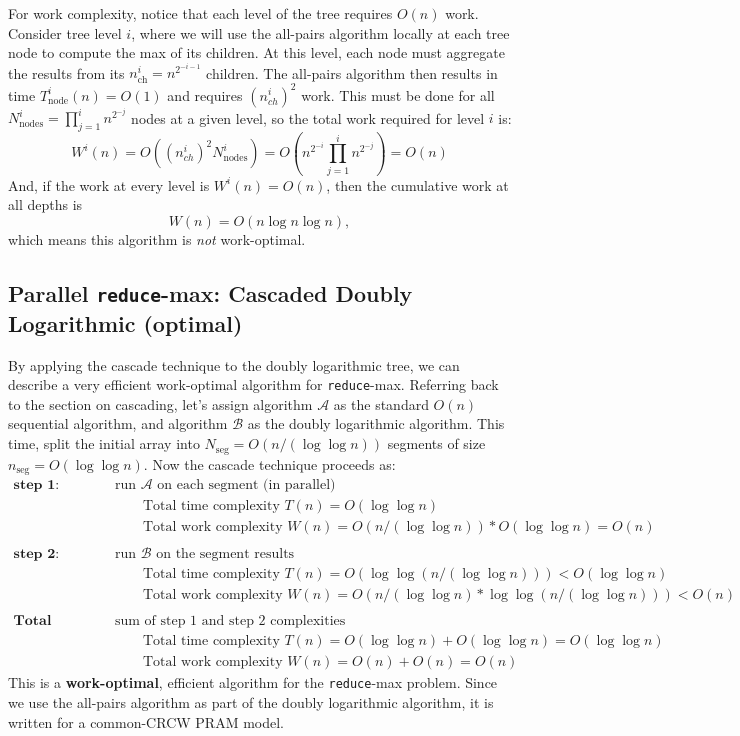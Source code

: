 \documentclass[twoside]{article}
\begin{document}
For work complexity, notice that each level of the tree requires $O(n)$ work. Consider tree level $i$, where we will use the all-pairs algorithm locally at each tree node to compute the max of its children. At this level, each node must aggregate the results from its $n_{\text{ch}}^i = n^{2^{-i-1}}$ children. The all-pairs algorithm then results in time $T_{\text{node}}^i(n) = O(1)$ and requires $(n_{ch}^{i})^2$ work. This must be done for all $N^{i}_{\text{nodes}} = \prod_{j=1}^{i}n^{2^{-j}}$ nodes at a given level, so the total work required for level $i$ is:
\[
W^{i}(n) = O((n_{ch}^{i})^{2}N^{i}_{\text{nodes}}) = O\left(n^{2^{-i}} \prod_{j=1}^{i}n^{2^{-j}}\right) = O(n)
\]
And, if the work at every level is $W^{i}(n) = O(n)$, then the cumulative work at all depths is
\[
W(n) = O(n\log n \log n),
\]
which means this algorithm is \textit{not} work-optimal.

\subsection{Parallel \texttt{reduce}-max: Cascaded Doubly Logarithmic (optimal)}
By applying the cascade technique to the doubly logarithmic tree, we can describe a very efficient work-optimal algorithm for \texttt{reduce}-max. Referring back to the section on cascading, let's assign algorithm $\mathcal{A}$ as the standard $O(n)$ sequential algorithm, and algorithm $\mathcal{B}$ as the doubly logarithmic algorithm. This time, split the initial array into $N_{\text{seg}} = O(n/(\log \log n))$ segments of size $n_{\text{seg}} = O(\log \log n)$. Now the cascade technique proceeds as:
\begin{align*}
\textbf{step 1: }& \text{run $\mathcal{A}$ on each segment (in parallel)}\\
& \qquad \text{Total time complexity } T(n) = O(\log \log n) \\
& \qquad \text{Total work complexity } W(n) = O(n/(\log \log n))*O(\log \log n) = O(n)\\
&\\
\textbf{step 2: }& \text{run $\mathcal{B}$ on the segment results}\\
& \qquad \text{Total time complexity } T(n) = O(\log \log(n/(\log \log n))) < O(\log \log n) \\
& \qquad \text{Total work complexity } W(n) = O(n/(\log \log n) * \log \log(n/(\log \log n))) < O(n)\\
&\\
\textbf{Total Complexity: }& \text{sum of step 1 and step 2 complexities}\\
& \qquad \text{Total time complexity } T(n) = O(\log \log n) + O(\log \log n)  = O(\log \log n)\\
& \qquad \text{Total work complexity } W(n) = O(n) + O(n) = O(n)
\end{align*}
This is a \textbf{work-optimal}, efficient algorithm for the \texttt{reduce}-max problem. Since we use the all-pairs algorithm as part of the doubly logarithmic algorithm, it is written for a common-CRCW PRAM model.
\end{document}
